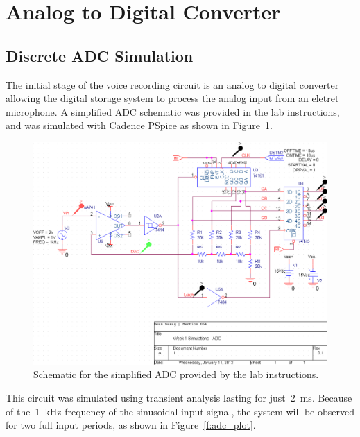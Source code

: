 \section{Analog to Digital Converter}
\subsection{Discrete ADC Simulation}
The initial stage of the voice recording circuit is an analog to digital
converter allowing the digital storage system to process the analog input from
an eletret microphone.  A simplified ADC schematic was provided in the lab
instructions, and was simulated with Cadence PSpice as shown in
Figure~\ref{f:adc_schem}.
%
\begin{figure}[H]
\centering
	\includegraphics[width=.8\textwidth]{img/shot/part2_schem_cropped.PNG}
	\parbox{.8\textwidth}{
	\caption[Discrete ADC --- Schematic]{Schematic for the simplified ADC
	provided by the lab instructions.}
	\label{f:adc_schem}}
\end{figure}
%
This circuit was simulated using transient analysis lasting for
just~\SI{2}{\milli\second}.  Because of the~\SI{1}{\kilo\hertz} frequency of
the sinusoidal input signal, the system will be observed for two full input
periods, as shown in Figure~\ref{f:adc_plot}.

